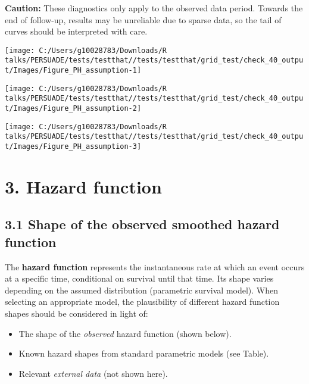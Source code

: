 \documentclass[
]{article}
\providecommand{\tightlist}{%
  \setlength{\itemsep}{0pt}\setlength{\parskip}{0pt}}
\begin{document}
\textbf{Caution:} These diagnostics only apply to the observed data
period. Towards the end of follow-up, results may be unreliable due to
sparse data, so the tail of curves should be interpreted with care.

\clearpage

\begin{flushleft}\texttt{[image: C:/Users/g10028783/Downloads/R talks/PERSUADE/tests/testthat//tests/testthat/grid\_test/check\_40\_output/Images/Figure\_PH\_assumption-1]} \end{flushleft}

\begin{flushleft}\texttt{[image: C:/Users/g10028783/Downloads/R talks/PERSUADE/tests/testthat//tests/testthat/grid\_test/check\_40\_output/Images/Figure\_PH\_assumption-2]} \end{flushleft}

\begin{flushleft}\texttt{[image: C:/Users/g10028783/Downloads/R talks/PERSUADE/tests/testthat//tests/testthat/grid\_test/check\_40\_output/Images/Figure\_PH\_assumption-3]} \end{flushleft}

\clearpage

\section{3. Hazard function}\label{hazard-function}

\subsection{3.1 Shape of the observed smoothed hazard
function}\label{shape-of-the-observed-smoothed-hazard-function}

The \textbf{hazard function} represents the instantaneous rate at which
an event occurs at a specific time, conditional on survival until that
time. Its shape varies depending on the assumed distribution (parametric
survival model). When selecting an appropriate model, the plausibility
of different hazard function shapes should be considered in light of:

\begin{itemize}
\tightlist
\item
  The shape of the \emph{observed} hazard function (shown below).
\item
  Known hazard shapes from standard parametric models (see Table).
\item
  Relevant \emph{external data} (not shown here).
\end{itemize}
\end{document}
